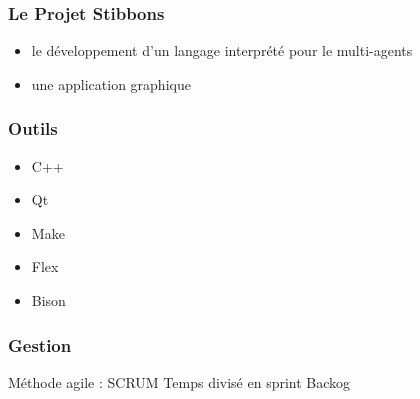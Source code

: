 \begin{frame}
\frametitle{Le Projet Stibbons}
\begin{itemize}
\item le développement d'un langage interprété pour le multi-agents
\item une application graphique 
\end{itemize}
\end{frame}

\begin{frame}
\frametitle{Outils}
\begin{itemize}
\item C++
\item Qt
\item Make
\item Flex 
\item Bison
\end{itemize}
\end{frame}

\begin{frame}
\frametitle{Gestion}
Méthode agile : SCRUM
\rightarrow Temps divisé en sprint 
\rightarrow Backog
\end{frame}